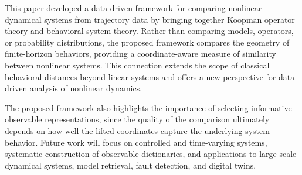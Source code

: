 \documentclass[letterpaper, 10 pt, conference]{ieeeconf}  %
\begin{document}
This paper developed a data-driven framework for comparing nonlinear dynamical systems from trajectory data by bringing together Koopman operator theory and behavioral system theory. Rather than comparing models, operators, or probability distributions, the proposed framework compares the geometry of finite-horizon behaviors, providing a coordinate-aware measure of similarity between nonlinear systems. This connection extends the scope of classical behavioral distances beyond linear systems and offers a new perspective for data-driven analysis of nonlinear dynamics.

The proposed framework also highlights the importance of selecting informative observable representations, since the quality of the comparison ultimately depends on how well the lifted coordinates capture the underlying system behavior. Future work will focus on controlled and time-varying systems, systematic construction of observable dictionaries, and applications to large-scale dynamical systems, model retrieval, fault detection, and digital twins. 

















\end{document}
